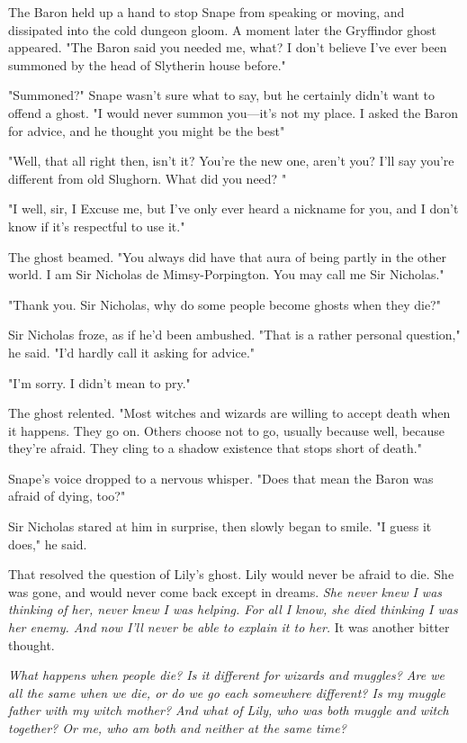 The Baron held up a hand to stop Snape from speaking or moving, and dissipated into the cold dungeon gloom. A moment later the Gryffindor ghost appeared. "The Baron said you needed me, what? I don't believe I've ever been summoned by the head of Slytherin house before."

"Summoned?" Snape wasn't sure what to say, but he certainly didn't want to offend a ghost. "I would never summon you—it's not my place. I asked the Baron for advice, and he thought you might be the best{\el}"

"Well, that all right then, isn't it? You're the new one, aren't you? I'll say you're different from old Slughorn. What did you need? "

"I{\el} well, sir, I{\el} Excuse me, but I've only ever heard a nickname for you, and I don't know if it's respectful to use it."

The ghost beamed. "You always did have that aura of being partly in the other world. I am Sir Nicholas de Mimsy-Porpington. You may call me Sir Nicholas."

"Thank you. Sir Nicholas, why do some people become ghosts when they die?"

Sir Nicholas froze, as if he'd been ambushed. "That is a rather personal question," he said. "I'd hardly call it asking for advice."

"I'm sorry. I didn't mean to pry."

The ghost relented. "Most witches and wizards are willing to accept death when it happens. They go on. Others choose not to go, usually because{\el} well, because they're afraid. They cling to a shadow existence that stops short of death."

Snape's voice dropped to a nervous whisper. "Does that mean the Baron was afraid of dying, too?"

Sir Nicholas stared at him in surprise, then slowly began to smile. "I guess it does," he said.

That resolved the question of Lily's ghost. Lily would never be afraid to die. She was gone, and would never come back except in dreams. \emph{She never knew I was thinking of her, never knew I was helping. For all I know, she died thinking I was her enemy. And now I'll never be able to explain it to her.} It was another bitter thought.

\emph{What happens when people die? Is it different for wizards and muggles? Are we all the same when we die, or do we go each somewhere different? Is my muggle father with my witch mother? And what of Lily, who was both muggle and witch together? Or me, who am both and neither at the same time?}

